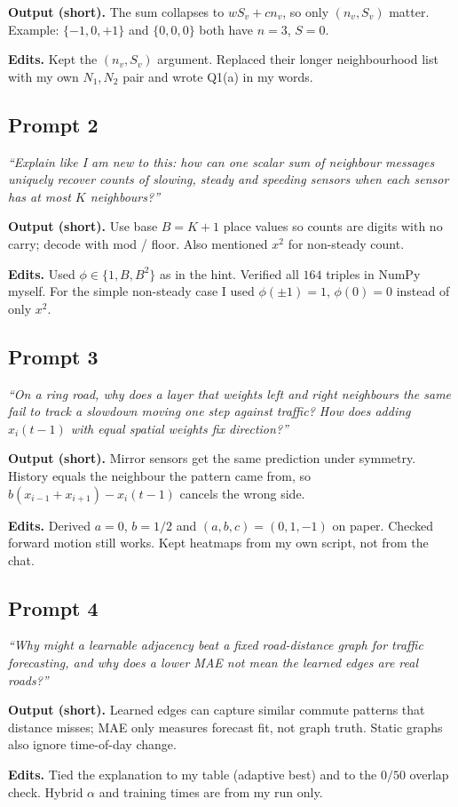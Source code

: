 \documentclass[11pt,a4paper]{article}
\begin{document}
\noindent\textbf{Output (short).} The sum collapses to $wS_v+cn_v$, so only $(n_v,S_v)$ matter. Example: $\{-1,0,+1\}$ and $\{0,0,0\}$ both have $n=3$, $S=0$.

\noindent\textbf{Edits.} Kept the $(n_v,S_v)$ argument. Replaced their longer neighbourhood list with my own $N_1,N_2$ pair and wrote Q1(a) in my words.

\subsection*{Prompt 2}
\textit{``Explain like I am new to this: how can one scalar sum of neighbour messages uniquely recover counts of slowing, steady and speeding sensors when each sensor has at most $K$ neighbours?''}

\noindent\textbf{Output (short).} Use base $B=K+1$ place values so counts are digits with no carry; decode with mod / floor. Also mentioned $x^2$ for non-steady count.

\noindent\textbf{Edits.} Used $\phi\in\{1,B,B^2\}$ as in the hint. Verified all $164$ triples in NumPy myself. For the simple non-steady case I used $\phi(\pm1)=1$, $\phi(0)=0$ instead of only $x^2$.

\subsection*{Prompt 3}
\textit{``On a ring road, why does a layer that weights left and right neighbours the same fail to track a slowdown moving one step against traffic? How does adding $x_i(t-1)$ with equal spatial weights fix direction?''}

\noindent\textbf{Output (short).} Mirror sensors get the same prediction under symmetry. History equals the neighbour the pattern came from, so $b(x_{i-1}+x_{i+1})-x_i(t-1)$ cancels the wrong side.

\noindent\textbf{Edits.} Derived $a=0$, $b=1/2$ and $(a,b,c)=(0,1,-1)$ on paper. Checked forward motion still works. Kept heatmaps from my own script, not from the chat.

\subsection*{Prompt 4}
\textit{``Why might a learnable adjacency beat a fixed road-distance graph for traffic forecasting, and why does a lower MAE not mean the learned edges are real roads?''}

\noindent\textbf{Output (short).} Learned edges can capture similar commute patterns that distance misses; MAE only measures forecast fit, not graph truth. Static graphs also ignore time-of-day change.

\noindent\textbf{Edits.} Tied the explanation to my table (adaptive best) and to the $0/50$ overlap check. Hybrid $\alpha$ and training times are from my run only.
\end{document}
